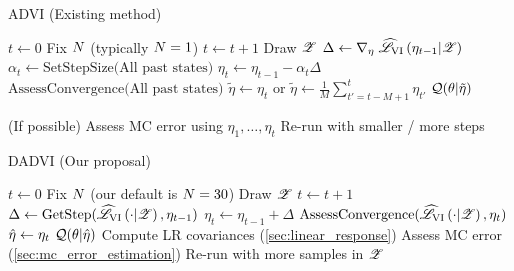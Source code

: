 %
\begin{minipage}{1.0\linewidth}
    \begin{minipage}[t]{0.49\linewidth}
        \begin{algorithm}[H]
        \caption{ADVI (Existing method)}\label{alg:sadvi}
        \begin{algorithmic}
            \State $t \gets 0$
            \State Fix $N$ (typically $N = 1$)
                \State $t \gets t + 1$
                \State Draw $\mathscr{Z}$
                \State $\Delta \gets \nabla_{\eta} \left. \widehat{\mathscr{L}}_{\mathrm{VI}}\left(\eta_{t-1} | \mathscr{Z}\right) \right.$
                \State $\alpha_t \gets \textrm{SetStepSize(All past states)}$
                \State $\eta_t \gets \eta_{t-1} - \alpha_t \Delta$
                \State $\textrm{AssessConvergence(All past states)}$
            \EndWhile
            \State $\tilde{\eta} \gets \eta_t$ or
                $\tilde{\eta} \gets \frac{1}{M} \sum_{t'=t- M + 1}^t \eta_{t'}$
            \State \Return $\mathcal{Q}(\theta \vert \tilde{\eta})$
        \EndProcedure

        \Postprocessing \hspace{1em}(If possible)
            \State Assess MC error using $\eta_1, \ldots, \eta_t$
                \State Re-run with smaller / more steps
            \EndIf
        \EndPostprocessing
        \end{algorithmic}
        \end{algorithm}
    \end{minipage}
    \begin{minipage}[t]{0.49\linewidth}
        \begin{algorithm}[H]
        \caption{DADVI (Our proposal)}\label{alg:dadvi}
        \begin{algorithmic}
            \State $t \gets 0$
            \State Fix $N$ (our default is $N = 30$)
            \State Draw $\mathscr{Z}$
                \State $t \gets t + 1$
                \State
    $\Delta \gets \textrm{GetStep}(\widehat{\mathscr{L}}_{\mathrm{VI}}\left(\cdot | \mathscr{Z}\right), \eta_{t-1})$
                \State $\eta_t \gets \eta_{t-1} + \Delta$
                \State $\textrm{AssessConvergence}(\widehat{\mathscr{L}}_{\mathrm{VI}}\left(\cdot | \mathscr{Z}\right), \eta_t)$
            \EndWhile
            \State $\hat{\eta} \gets \eta_t$
            \State \Return $\mathcal{Q}(\theta \vert \hat{\eta})$
        \EndProcedure
        \Postprocessing
            \State Compute LR covariances (\cref{sec:linear_response})
            \State Assess MC error (\cref{sec:mc_error_estimation})
                \State Re-run with more samples in $\mathscr{Z}$
            \EndIf
        \EndPostprocessing
        \end{algorithmic}
        \end{algorithm}
    \end{minipage}
\end{minipage}
